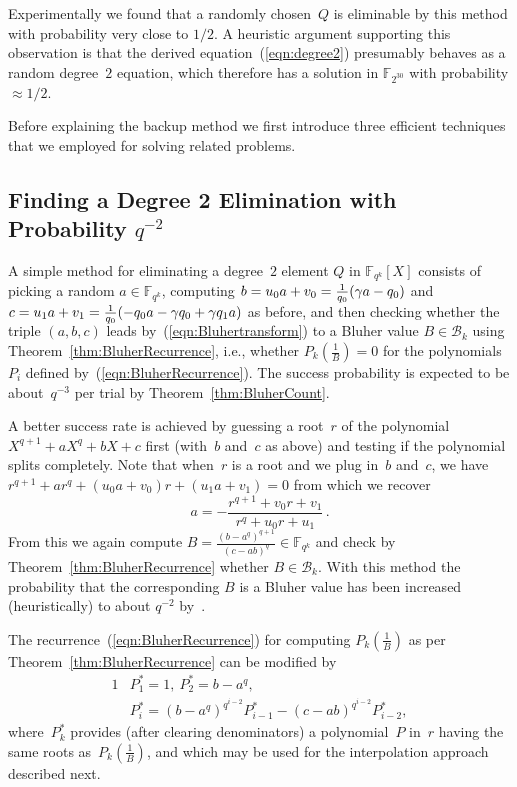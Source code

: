 \documentclass[11pt]{llncs}
\newcommand{\F}{\mathbb F}
\begin{document}
Experimentally we found that a randomly chosen~$Q$ is eliminable by this method with probability very 
close to $1/2$. A heuristic argument supporting this observation is that the derived equation~(\ref{eqn:degree2}) presumably behaves as a random degree~$2$ equation, which 
therefore has a solution in $\F_{2^{30}}$ with probability $\approx 1/2$. 

Before explaining the backup method we first introduce three efficient techniques that we employed for solving related problems.

\subsection{Finding a Degree 2 Elimination with Probability $q^{-2}$}\label{sec:qpowminus2}

A simple method for eliminating a degree~$2$ element $Q$ in $\F_{q^k}[X]$ consists of picking a random $a \in \F_{q^k}$, 
computing $b = u_0 a + v_0 = \smash{\frac 1 {q_0}} (\gamma a - q_0)$ and $c = u_1 a + v_1 = \smash{\frac 1 {q_0}} (-q_0 a - \gamma q_0 + \gamma q_1 a)$ as before,
and then checking whether the triple $(a,b,c)$ leads by~(\ref{eqn:Bluhertransform}) to a Bluher value $B \in {\mathcal B}_{k}$ using 
Theorem~\ref{thm:BluherRecurrence}, i.e., whether $P_k(\frac 1 B) = 0$ for the polynomials~$P_i$ defined by~(\ref{eqn:BluherRecurrence}). 
The success probability is expected to be about~$q^{-3}$ per trial by Theorem~\ref{thm:BluherCount}.

A better success rate is achieved by guessing a root~$r$ of the polynomial $X^{q+1} + a X^q + b X + c$ first (with~$b$ and~$c$ as
above) and testing if the polynomial splits completely. Note that when~$r$ is a root and we plug
in~$b$ and~$c$, we have $r^{q+1} + a r^q + (u_0 a + v_0) r +(u_1 a + v_1) = 0$ from which we recover
\[ a = - \frac {r^{q+1} + v_0 r + v_1} {r^q + u_0 r + u_1} \,. \]
From this we again compute $B = \frac {(b - a^q)^{q+1}} {(c - a b)^q} \in \F_{q^{k}}$ and check by
Theorem~\ref{thm:BluherRecurrence} whether $B \in {\mathcal B}_{k}$.
With this method the probability that the corresponding $B$ is a Bluher value has
been increased (heuristically) to about $q^{-2}$ by~\cite[Thm.~5.6]{bluher}.

The recurrence~(\ref{eqn:BluherRecurrence}) for computing
$P_k(\frac 1 B)$ as per Theorem~\ref{thm:BluherRecurrence} can be modified by
\begin{alignat*}{1}
&P^*_1 = 1 ,\ P^*_2 = b - a^q , \\
&P^*_i = (b - a^q)^{q^{i-2}} P^*_{i-1} - (c - a b)^{q^{i-2}} P^*_{i-2} ,
\end{alignat*}
where~$P^*_k$ provides (after clearing denominators) a polynomial~$P$
in~$r$ having the same roots as~$P_k(\frac 1 B)$, and which may be
used for the interpolation approach described next.
\end{document}
